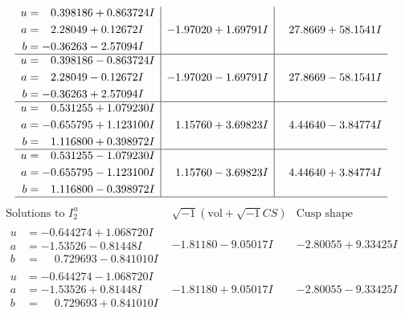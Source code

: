 \documentclass[1p]{elsarticle_modified}
\theoremstyle{definition}
\newcommand{\I}{\sqrt{-1}}
\begin{document}
$$\begin{array}{c|c|c}
\begin{aligned}
u &= \phantom{-}0.398186 + 0.863724 I \\
a &= \phantom{-}2.28049 + 0.12672 I \\
b &= -0.36263 - 2.57094 I\end{aligned}
 & -1.97020 + 1.69791 I & \phantom{-}27.8669 + 58.1541 I \\ \hline\begin{aligned}
u &= \phantom{-}0.398186 - 0.863724 I \\
a &= \phantom{-}2.28049 - 0.12672 I \\
b &= -0.36263 + 2.57094 I\end{aligned}
 & -1.97020 - 1.69791 I & \phantom{-}27.8669 - 58.1541 I \\ \hline\begin{aligned}
u &= \phantom{-}0.531255 + 1.079230 I \\
a &= -0.655795 + 1.123100 I \\
b &= \phantom{-}1.116800 + 0.398972 I\end{aligned}
 & \phantom{-}1.15760 + 3.69823 I & \phantom{-}4.44640 - 3.84774 I \\ \hline\begin{aligned}
u &= \phantom{-}0.531255 - 1.079230 I \\
a &= -0.655795 - 1.123100 I \\
b &= \phantom{-}1.116800 - 0.398972 I\end{aligned}
 & \phantom{-}1.15760 - 3.69823 I & \phantom{-}4.44640 + 3.84774 I\\
 \hline 
 \end{array}$$\newpage$$\begin{array}{c|c|c}  
\text{Solutions to }I^u_{2}& \I (\text{vol} + \sqrt{-1}CS) & \text{Cusp shape}\\
 \hline 
\begin{aligned}
u &= -0.644274 + 1.068720 I \\
a &= -1.53526 - 0.81448 I \\
b &= \phantom{-}0.729693 - 0.841010 I\end{aligned}
 & -1.81180 - 9.05017 I & -2.80055 + 9.33425 I \\ \hline\begin{aligned}
u &= -0.644274 - 1.068720 I \\
a &= -1.53526 + 0.81448 I \\
b &= \phantom{-}0.729693 + 0.841010 I\end{aligned}
 & -1.81180 + 9.05017 I & -2.80055 - 9.33425 I \\ \hline\begin{aligned}

\end{aligned}
\end{array}$$
\end{document}
